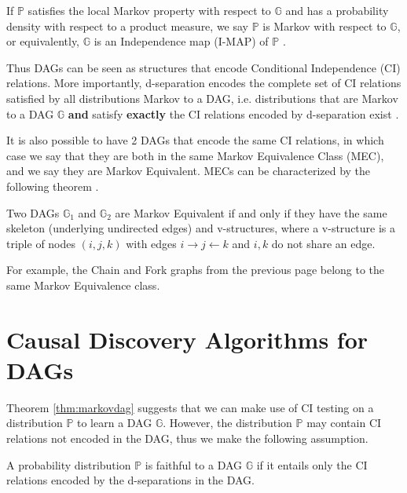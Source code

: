 \documentclass{tufte-book}
\begin{document}
If \(\mathbb{P}\) satisfies the local Markov property with respect to \(\mathbb{G}\) and has a probability density with respect to a product measure, we say \(\mathbb{P}\) is Markov with respect to \(\mathbb{G}\), or equivalently, \(\mathbb{G}\) is an Independence map (I-MAP) of \(\mathbb{P}\) \cite{lauritzen-1996-graph}.

Thus DAGs can be seen as structures that encode Conditional Independence (CI) relations. More importantly, d-separation encodes the complete set of CI relations satisfied by all distributions Markov to a DAG, i.e. distributions that are Markov to a DAG \(\mathbb{G}\) \textbf{and} satisfy \textbf{exactly} the CI relations encoded by d-separation exist \cite{meek-2013-stron-compl,geiger1990identifying}.

It is also possible to have 2 DAGs that encode the same CI relations, in which case we say that they are both in the same Markov Equivalence Class (MEC), and we say they are Markov Equivalent. MECs can be characterized by the following theorem \cite{verma-2013-equiv-causal-model}.

\begin{theorem}\label{thm:vermapearl}
Two DAGs $\mathbb{G}_1$ and $\mathbb{G}_2$ are Markov Equivalent if and only if they have the same skeleton (underlying undirected edges) and v-structures, where a v-structure is a triple of nodes $(i,j,k)$ with edges $i \rightarrow j \leftarrow k$ and $i,k$ do not share an edge.
\end{theorem}

For example, the Chain and Fork graphs from the previous page belong to the same Markov Equivalence class.

\section{Causal Discovery Algorithms for DAGs}
\label{sec:org64ff329}

Theorem \ref{thm:markovdag} suggests that we can make use of CI testing on a distribution \(\mathbb{P}\) to learn a DAG \(\mathbb{G}\). However, the distribution \(\mathbb{P}\) may contain CI relations not encoded in the DAG, thus we make the following assumption.

\begin{definition}[Faithfulness]\label{def:faithfulness}

A probability distribution $\mathbb{P}$ is faithful to a DAG $\mathbb{G}$ if it entails only the CI relations encoded by the d-separations in the DAG.

\end{definition}
\end{document}
